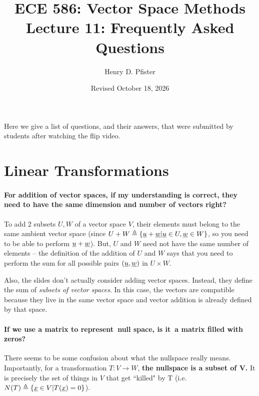 \documentclass[10pt,english]{article}
\begin{document}
\title{ECE 586: Vector Space Methods \\ Lecture 11: Frequently Asked Questions}
\author{Henry D. Pfister \\ \univ}
\date{Revised October 18, 2026}

\maketitle

Here we give a list of questions, and their answers, that were submitted by students after watching the flip video.

\section{Linear Transformations}

\paragraph{For addition of vector spaces, if my understanding is correct, they need to have the same dimension and number of vectors right?}

To add 2 subsets $U, W$ of a vector space $V$, their elements must belong to the same ambient vector space (since $U+W \triangleq \{\underline{u}+\underline{w}| \underline{u}\in U, \underline{w}\in W\}$, so you need to be able to perform $\underline{u}+\underline{w}$).
But, $U$ and $W$ need not have the same number of elements -- the definition of the addition of $U$ and $W$ says that you need to perform the sum for all possible pairs $(\underline{u},\underline{w})$ in $U\times W$.

Also, the slides don't actually consider adding vector spaces.
Instead, they define the sum of \emph{subsets of vector spaces}.
In this case, the vectors are compatible because they live in the same vector space and vector addition is already defined by that space.


\paragraph{If we use a matrix to represent null space, is it a matrix filled with zeros?}
There seems to be some confusion about what the nullspace really means.
Importantly, for a transformation $T: V \rightarrow W$, \textbf{the nullspace is a subset of V.} It is precisely the set of things in $V$ that get ``killed" by T (i.e. $N(T) \triangleq \{\underline{x}\in V| T(\underline{x}) = 0\}$).
\end{document}
